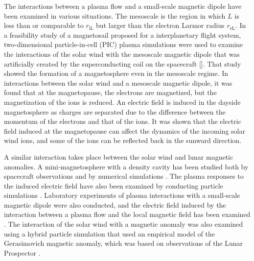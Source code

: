 \documentclass[draft,jgrga]{agutex2015}
\begin{document}
\begin{article}
The interactions between a plasma flow and a small-scale magnetic dipole 
have been examined in various situations.
The mesoscale is the region in which $L$ is less than or comparable to $r_\mathrm{iL}$
but larger than the electron Larmor radius $r_\mathrm{eL}$.
In a feasibility study of a magnetosail proposed for a interplanetary flight system, two-dimensional
particle-in-cell (PIC) plasma simulations were used to examine
the interactions of the solar wind with the mesoscale magnetic dipole that was artificially created by the
superconducting coil on the spacecraft [\cite{Moritaka2012}].
That study showed the formation of a magnetosphere even in the mesoscale regime.
In interactions between the solar wind and a mesoscale magnetic dipole, it was found that at the magnetopause,
the electrons are magnetized, but the magnetization of the ions is reduced.
An electric field is induced in the dayside magnetosphere as charges are separated
due to the difference between the momentum of the electrons and that of the ions.
It was shown that the electric field induced at the magnetopause
can affect the dynamics of the incoming solar wind ions, and some of the ions can be reflected
back in the sunward direction.

A similar interaction takes place between the solar wind and lunar magnetic anomalies.
A mini-magnetosphere with a density cavity has been studied both by
 spacecraft observations and by numerical simulations
\citep[e.g.,][]{Harnett2000,Harnett2003,Halekas2008b,Bamford2012}.
The plasma responses to the induced electric field have also been examined
by conducting particle simulations
\citep[e.g.,][]{Harnett2002,Kallio2012,Poppe2012a,Deca2014,Deca2015}.
Laboratory experiments of plasma interactions
with a small-scale magnetic dipole
were also conducted, and the electric field 
induced by the interaction
between a plasma flow and the local magnetic field has been examined
\citep[e.g.,][]{Howes2015,Jarvinen2014,Wang2013,Bamford2012}.
The interaction of the solar wind with a magnetic anomaly was also 
examined using a hybrid particle simulation that used  
an empirical model of the Gerasimovich magnetic anomaly, which was based 
on observations of the Lunar Prospector 
\citep{Fatemi2015}.


\end{article}
\end{document}
